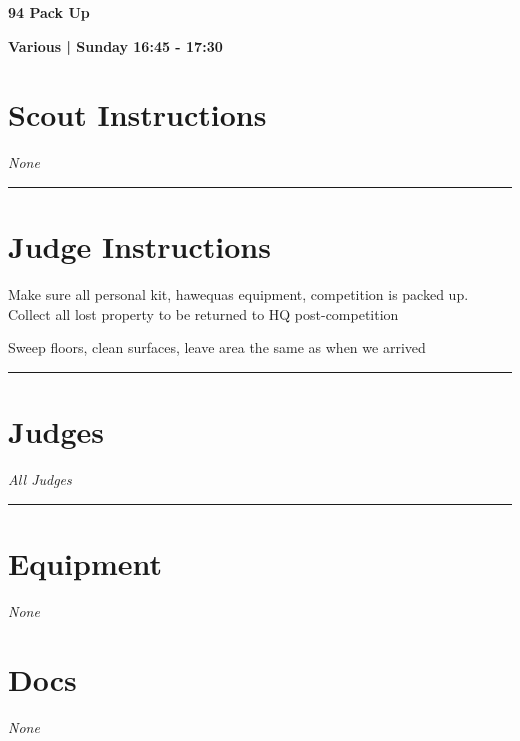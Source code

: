 \documentclass[10pt]{article}
\newcommand{\newtitle}[1]{\begin{center}{\Huge\bfseries #1 }\\ \vspace{5mm}\end{center}}
\newcommand{\newsubtitle}[1]{\begin{center}{\color{grey}\Large\bfseries #1 }\\ \vspace{5mm}\end{center}}
\begin{document}
	\vspace{1cm}


	\clearpage
		\newtitle{94 Pack Up }
	\newsubtitle{Various | Sunday 16:45 - 17:30}
		\setcounter{section}{93}
	\section*{Scout Instructions}
		\textit{None}
	
	\vspace{0.5cm}
	\hrule
	\vspace{0.5cm}

		\section*{Judge Instructions}
		Make sure all personal kit, hawequas equipment, competition is packed up. Collect all lost property to be returned to HQ post-competition

Sweep floors, clean surfaces, leave area the same as when we arrived
\vspace{0.5cm}
	\hrule
	\vspace{0.5cm}
		\section*{\faUsers \: Judges}

					\textit{All Judges}
			\vspace{0.5cm}
	\hrule
	\vspace{0.5cm}

	\begin{multicols}{2}

		\section*{\faWrench \: Equipment}

				\textit{None}
		
		\vfill\null
		\columnbreak

			\section*{\faFile \: Docs}
		 	\textit{None}
	

		\vfill\null

		\end{multicols}



	\vspace{1cm}
\end{document}
